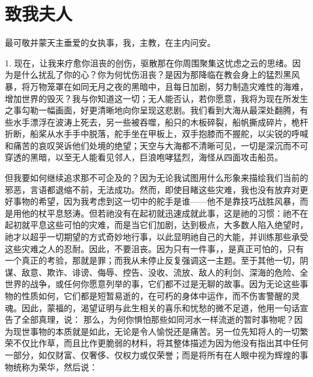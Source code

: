 
\section{致我夫人}

最可敬并蒙天主垂爱的女执事，我，主教，在主内问安。\par

1. 现在，让我来疗愈你沮丧的创伤，驱散那在你周围聚集这忧虑之云的思绪。因为是什么扰乱了你的心？你为何忧伤沮丧？是因为那降临在教会身上的猛烈黑风暴，将万物笼罩在如同无月之夜的黑暗中，且每日加剧，努力制造灾难性的海难，增加世界的毁灭？我与你知道这一切；无人能否认，若你愿意，我将为现在所发生之事勾勒一幅画面，好更清晰地向你呈现这悲剧。我们看到大海从最深处翻腾，有些水手漂浮在波涛上死去，另一些被吞噬，船只的木板碎裂，船帆撕成碎片，桅杆折断，船桨从水手手中脱落，舵手坐在甲板上，双手抱膝而不握舵，以尖锐的呼喊和痛苦的哀叹哭诉他们处境的绝望；天空与大海都不清晰可见，一切是深沉而不可穿透的黑暗，以至无人能看见邻人，巨浪咆哮猛烈，海怪从四面攻击船员。\par

但我要如何继续追求那不可企及的？因为无论我试图用什么形象来描绘我们当前的邪恶，言语都退缩不前，无法成功。然而，即使目睹这些灾难，我也没有放弃对更好事物的希望，因为我考虑到这一切中的舵手是谁——他不是靠技巧战胜风暴，而是用他的杖平息怒涛。但若祂没有在起初就迅速成就此事，这是祂的习惯：祂不在起初就平息这些可怕的灾难，而是当它们加剧，达到极点，大多数人陷入绝望时，祂才以超乎一切期望的方式奇妙地行事，以此显明祂自己的大能，并训练那些承受这些灾难之人的忍耐。因此，不要沮丧。因为只有一件事，，是真正可怕的，只有一个真正的考验，那就是罪；而我从未停止反复强调这一主题。至于其他一切，阴谋、敌意、欺诈、诽谤、侮辱、控告、没收、流放、敌人的利剑、深海的危险、全世界的战争，或任何你愿意列举的事，它们都不过是无聊的故事。因为无论这些事物的性质如何，它们都是短暂易逝的，在可朽的身体中运作，而不伤害警醒的灵魂。因此，蒙福的，渴望证明与此生相关的喜乐和忧愁的微不足道，他用一句话宣告了全部真理，说： 那么，为何你惧怕那些如同河水一样流逝的暂时事物呢？因为现世事物的本质就是如此，无论是令人愉悦还是痛苦。另一位先知将人的一切繁荣不仅比作草，而且比作更脆弱的材料，将其整体描述为因为他没有指出其中任何一部分，如仅财富、仅奢侈、仅权力或仅荣誉；而是将所有在人眼中视为辉煌的事物统称为荣华，然后说：\par


